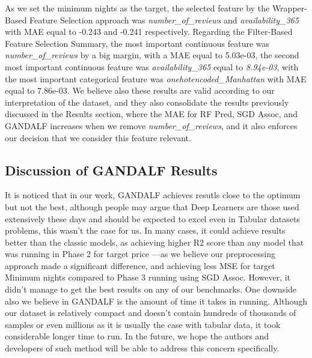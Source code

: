 \documentclass[a4paper,12pt]{article}
\begin{document}
As we set the minimum nights as the target, the selected feature by the Wrapper-Based Feature Selection approach was \textit{number\_of\_reviews} and \textit{availability\_365} with MAE equal to -0.243 and -0.241 respectively. Regarding the Filter-Based Feature Selection Summary, the most important continuous feature was \textit{number\_of\_reviews} by a big margin, with a MAE equal to 5.03e-03, the second most important continuous feature was \textit{availability\_365} equal to \textit{8.94e-03}, with the most important categorical feature was \textit{onehotencoded\_Manhattan} with MAE equal to 7.86e-03. We believe also these results are valid according to our interpretation of the dataset, and they also consolidate the results previously discussed in the Results section, where the MAE for RF Pred, SGD Assoc, and GANDALF increases when we remove \textit{number\_of\_reviews}, and it also enforces our decision that we consider this feature relevant.

\subsection*{Discussion of GANDALF Results}

It is noticed that in our work, GANDALF achieves resutls close to the optimum but not the best, although people may argue that Deep Learners are those used extensively these days and should be expected to excel even in Tabular datasets problems, this wasn't the case for us. In many cases, it could achieve results better than the classic models, as achieving higher R2 score than any model that was running in Phase 2 for target price —as we believe our preprocessing approach made a significant difference, and achieving less MSE for target Minimum nights compared to Phase 3 running using SGD Assoc. However, it didn't manage to get the best results on any of our benchmarks. One downside also we believe in GANDALF is the amount of time it takes in running. Although our dataset is relatively compact and doesn't contain hundreds of thousands of samples or even millions as it is usually the case with tabular data, it took considerable longer time to run. In the future, we hope the authors and developers of such method will be able to address this concern specifically.
\end{document}
